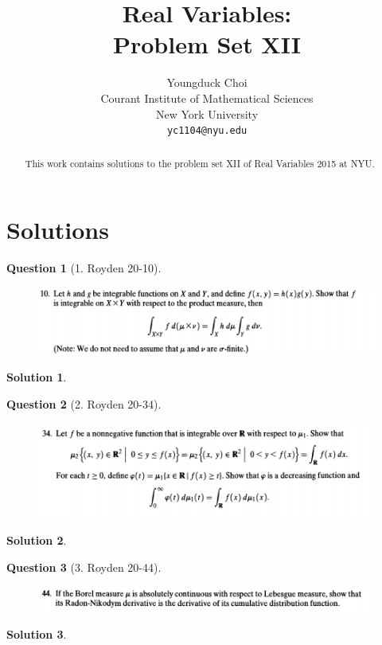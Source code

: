 \documentclass{article} %
\title{Real Variables: \\
Problem Set XII}
\author{
Youngduck Choi \\
Courant Institute of Mathematical Sciences \\
New York University \\
\texttt{yc1104@nyu.edu} \\
}
\theoremstyle{quest}
\newtheorem*{question}{Question}
\newtheorem*{solution}{Solution}
\begin{document}
\maketitle

\begin{abstract}
This work contains solutions to the problem set 
XII of Real Variables 2015 at NYU.
\end{abstract}

\section{Solutions}

\begin{question}[1. Royden 20-10]
\hfill
\begin{figure}[h!]
  \centering
    \includegraphics[width=1\textwidth]{20-10.png}
\end{figure}
\end{question}
\begin{solution}

\end{solution}

\newpage

\begin{question}[2. Royden 20-34]
\hfill
\begin{figure}[h!]
  \centering
    \includegraphics[width=1\textwidth]{20-34.png}
\end{figure}
\end{question}
\begin{solution}

\end{solution}

\newpage
\begin{question}[3. Royden 20-44]
\hfill
\begin{figure}[h!]
  \centering
    \includegraphics[width=1\textwidth]{20-44.png}
\end{figure}
\end{question}
\begin{solution}

\end{solution}
\end{document}
